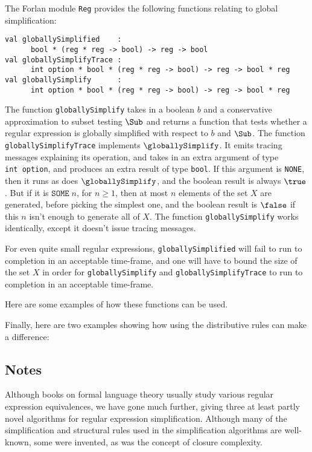 The Forlan module \texttt{Reg} provides the following functions
relating to global simplification:
\begin{verbatim}
val globallySimplified    :
      bool * (reg * reg -> bool) -> reg -> bool
val globallySimplifyTrace :
      int option * bool * (reg * reg -> bool) -> reg -> bool * reg
val globallySimplify      :
      int option * bool * (reg * reg -> bool) -> reg -> bool * reg
\end{verbatim}
The function \texttt{globallySimplify} takes in a boolean $b$ and a
conservative approximation to subset testing $\Sub$ and returns a
function that tests whether a regular expression is globally
simplified with respect to $b$ and $\Sub$.  The function
\texttt{globallySimplifyTrace} implements $\globallySimplify$.  It
emits tracing messages explaining its operation, and takes in an extra
argument of type \texttt{int~option}, and produces an extra result of
type \texttt{bool}.  If this argument is \texttt{NONE}, then it runs
as does $\globallySimplify$, and the boolean result is always $\true$.
But if it is $\mathtt{SOME}\;n$, for $n\geq 1$, then at most $n$
elements of the set $X$ are generated, before picking the simplest
one, and the boolean result is $\false$ if this $n$ isn't enough to
generate all of $X$.  The function \texttt{globallySimplify} works
identically, except it doesn't issue tracing messages.

For even quite small regular expressions,
\texttt{globallySimplified} will fail to run to completion in an
acceptable time-frame, and one will have to bound the size of the set
$X$ in order for \texttt{globallySimplify} and
\texttt{globallySimplifyTrace} to run to completion in an
acceptable time-frame.

Here are some examples of how these functions can be used.

Finally, here are two examples showing how using the distributive
rules can make a difference:


\subsection{Notes}

Although books on formal language theory usually study various regular
expression equivalences, we have gone much further, giving three at
least partly novel algorithms for regular expression simplification.
Although many of the simplification and structural rules used in the
simplification algorithms are well-known, some were invented, as was
the concept of closure complexity.

%
%
%

